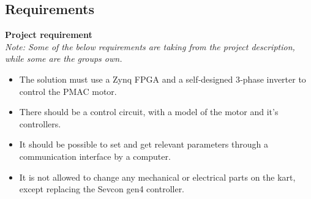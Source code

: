\subsection{Requirements}

\textbf{Project requirement} \\
\textit{Note: Some of the below requirements are taking from the project description, while some are the groups own.} \cite{Project 1. semester - S19}

\begin{itemize}
\item The solution must use a Zynq FPGA and a self‐designed 3‐phase inverter to control the PMAC motor.

\item There should be a control circuit, with a model of the motor and it's controllers.

\item It should be possible to set and get relevant parameters through a communication interface by a computer. 

\item It is not allowed to change any mechanical or electrical parts on the kart, except replacing the Sevcon gen4 controller. 

\end{itemize}